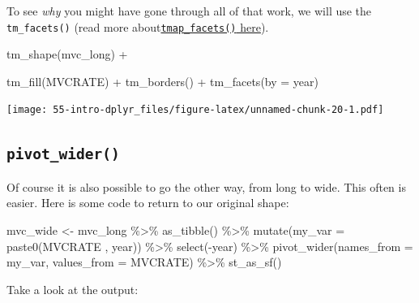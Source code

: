 \documentclass[
]{book}
\newenvironment{Shaded}{\begin{snugshade}}{\end{snugshade}}
\newcommand{\AttributeTok}[1]{\textcolor[rgb]{0.77,0.63,0.00}{#1}}
\newcommand{\FunctionTok}[1]{\textcolor[rgb]{0.00,0.00,0.00}{#1}}
\newcommand{\NormalTok}[1]{#1}
\newcommand{\OtherTok}[1]{\textcolor[rgb]{0.56,0.35,0.01}{#1}}
\newcommand{\SpecialCharTok}[1]{\textcolor[rgb]{0.00,0.00,0.00}{#1}}
\newcommand{\StringTok}[1]{\textcolor[rgb]{0.31,0.60,0.02}{#1}}
\begin{document}
To see \emph{why} you might have gone through all of that work, we will use the \texttt{tm\_facets()} (read more about\protect\hyperlink{tmap-facet}{\texttt{tmap\_facets()} here}).

\begin{Shaded}
\begin{Highlighting}[]
\FunctionTok{tm\_shape}\NormalTok{(mvc\_long) }\SpecialCharTok{+}
  
  \FunctionTok{tm\_fill}\NormalTok{(}\StringTok{\textquotesingle{}MVCRATE\textquotesingle{}}\NormalTok{) }\SpecialCharTok{+} 
  \FunctionTok{tm\_borders}\NormalTok{() }\SpecialCharTok{+}
\FunctionTok{tm\_facets}\NormalTok{(}\AttributeTok{by =} \StringTok{\textquotesingle{}year\textquotesingle{}}\NormalTok{)}
\end{Highlighting}
\end{Shaded}

\texttt{[image: 55-intro-dplyr\_files/figure-latex/unnamed-chunk-20-1.pdf]}

\hypertarget{pivot_wider}{%
\subsection{\texorpdfstring{\texttt{pivot\_wider()}}{pivot\_wider()}}\label{pivot_wider}}

Of course it is also possible to go the other way, from long to wide. This often is easier. Here is some code to return to our original shape:

\begin{Shaded}
\begin{Highlighting}[]
\NormalTok{mvc\_wide }\OtherTok{\textless{}{-}}\NormalTok{ mvc\_long }\SpecialCharTok{\%\textgreater{}\%}
  \FunctionTok{as\_tibble}\NormalTok{() }\SpecialCharTok{\%\textgreater{}\%}
  \FunctionTok{mutate}\NormalTok{(}\AttributeTok{my\_var =} \FunctionTok{paste0}\NormalTok{(}\StringTok{\textquotesingle{}MVCRATE \textquotesingle{}}\NormalTok{, year)) }\SpecialCharTok{\%\textgreater{}\%}
  \FunctionTok{select}\NormalTok{(}\SpecialCharTok{{-}}\NormalTok{year) }\SpecialCharTok{\%\textgreater{}\%}
  \FunctionTok{pivot\_wider}\NormalTok{(}\AttributeTok{names\_from =}\NormalTok{ my\_var,}
              \AttributeTok{values\_from =}\NormalTok{ MVCRATE) }\SpecialCharTok{\%\textgreater{}\%}
  \FunctionTok{st\_as\_sf}\NormalTok{()}
\end{Highlighting}
\end{Shaded}

Take a look at the output:
\end{document}
